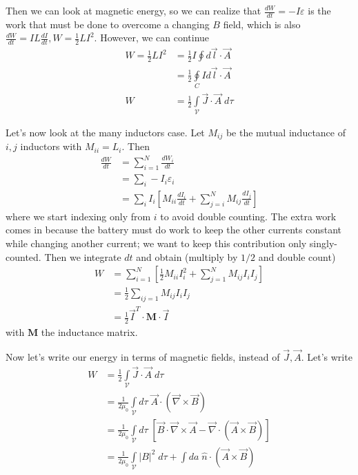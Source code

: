 \documentclass[10pt]{report}
\newcommand{\rd}[2]{\frac{d#1}{d#2}}
\newcommand{\abs}[1]{\left|#1\right|}
\begin{document}
Then we can look at magnetic energy, so we can realize that $\rd{W}{t} = -I\varepsilon$ is the work that must be done to overcome a changing $B$ field, which is also $\rd{W}{t} = IL\rd{I}{t}, W = \frac{1}{2}LI^2$. However, we can continue
\begin{align}
    W = \frac{1}{2}LI^2 &= \frac{1}{2}I\oint d\vec{l} \cdot \vec{A}\\
    &= \frac{1}{2}\oint\limits_C I d\vec{l} \cdot \vec{A}\\
    W &= \frac{1}{2}\int\limits_{\mathcal{V}}^{}\vec{J} \cdot \vec{A}\;d\tau
\end{align}

Let's now look at the many inductors case. Let $M_{ij}$ be the mutual inductance of $i,j$ inductors with $M_{ii} = L_i$. Then
\begin{align}
    \rd{W}{t} &= \sum_{i=1}^{N} \rd{W_i}{t}\\
    &= \sum_{i}^{}-I_i\varepsilon_i\\
    &= \sum_{i}^{}I_i\left[ M_{ii}\rd{I_i}{t} + \sum_{j=i}^{N} M_{ij}\rd{I_j}{t} \right]
\end{align}
where we start indexing only from $i$ to avoid double counting. The extra work comes in because the battery must do work to keep the other currents constant while changing another current; we want to keep this contribution only singly-counted. Then we integrate $dt$ and obtain (multiply by $1/2$ and double count)
\begin{align}
    W &= \sum_{i=1}^{N}\left[ \frac{1}{2}M_{ii}I_i^2 + \sum_{j = 1}^{N}M_{ij}I_iI_j\right]\\
    &= \frac{1}{2}\sum_{ij = 1}^{}M_{ij}I_iI_j\\
    &= \frac{1}{2}\vec{I}^T \cdot\mathbf{M}\cdot\vec{I}
\end{align}
with $\mathbf{M}$ the inductance matrix. 

Now let's write our energy in terms of magnetic fields, instead of $\vec{J}, \vec{A}$. Let's write
\begin{align}
    W &= \frac{1}{2}\int\limits_{\mathcal{V}}^{}\vec{J} \cdot \vec{A}\;d\tau\\
    &= \frac{1}{2\mu_0} \int\limits_{\mathcal{V}}^{}d\tau\;\vec{A} \cdot \left( \vec{\nabla} \times \vec{B} \right)\\
    &= \frac{1}{2\mu_0}\int\limits_{\mathcal{V}}^{}d\tau\;\left[ \vec{B} \cdot \vec{\nabla} \times \vec{A} - \vec{\nabla} \cdot (\vec{A} \times \vec{B}) \right]\\
    &= \frac{1}{2\mu_0}\int\limits_{\mathcal{V}}^{}\abs{B}^2\;d\tau + \int\limits_{}^{}da\;\hat{n} \cdot (\vec{A} \times \vec{B})
\end{align}
\end{document}
